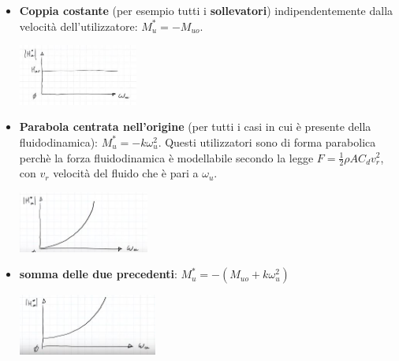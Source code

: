 \begin{itemize}
    \item \textbf{Coppia costante} (per esempio tutti i \textbf{sollevatori}) indipendentemente dalla velocità dell'utilizzatore: $M_u^* = - M_{uo}$.
    \begin{center}
        \includegraphics[height=2cm]{../lezione12/img10.JPG}
    \end{center}
    \item \textbf{Parabola centrata nell'origine} (per tutti i casi in cui è presente della fluidodinamica): $M_u^* = - k \omega_u^2$. Questi utilizzatori sono di forma parabolica perchè la forza fluidodinamica è modellabile secondo la legge $F = \frac{1}{2} \rho A C_d v_r^2$, con $v_r$ velocità del fluido che è pari a $\omega_u$.
    \begin{center}
        \includegraphics[height=2cm]{../lezione12/img11.JPG}
    \end{center}
    \item \textbf{somma delle due precedenti}: $M_u^* = - (M_{uo} + k \omega_u^2)$
    \begin{center}
        \includegraphics[height=2cm]{../lezione12/img12.JPG}
    \end{center}
\end{itemize}